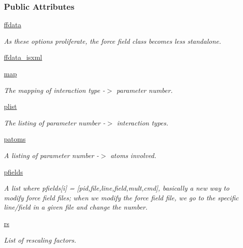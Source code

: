 \subsubsection*{Public Attributes}
\begin{DoxyCompactItemize}
\item 
\hyperlink{classsrc_1_1ffyapf_1_1FF_a68a3599d8d9a86173693142888875a75}{ffdata}
\begin{DoxyCompactList}\small\item\em As these options proliferate, the force field class becomes less standalone. \end{DoxyCompactList}\item 
\hyperlink{classsrc_1_1ffyapf_1_1FF_afdfcd362bdd2bee8c34193f0dda5aa3b}{ffdata\+\_\+isxml}
\item 
\hyperlink{classsrc_1_1ffyapf_1_1FF_ac0187f2700fff8b52387d1a9461bfacf}{map}
\begin{DoxyCompactList}\small\item\em The mapping of interaction type -\/$>$ parameter number. \end{DoxyCompactList}\item 
\hyperlink{classsrc_1_1ffyapf_1_1FF_a600c53e8b497f3cd6033ad04697fb40c}{plist}
\begin{DoxyCompactList}\small\item\em The listing of parameter number -\/$>$ interaction types. \end{DoxyCompactList}\item 
\hyperlink{classsrc_1_1ffyapf_1_1FF_a2e0e0f75682e55de01b54713d854528f}{patoms}
\begin{DoxyCompactList}\small\item\em A listing of parameter number -\/$>$ atoms involved. \end{DoxyCompactList}\item 
\hyperlink{classsrc_1_1ffyapf_1_1FF_a3a2bea7c7c3ecf63bb3cd98828c0fd58}{pfields}
\begin{DoxyCompactList}\small\item\em A list where pfields\mbox{[}i\mbox{]} = \mbox{[}pid,\textquotesingle{}file\textquotesingle{},line,field,mult,cmd\mbox{]}, basically a new way to modify force field files; when we modify the force field file, we go to the specific line/field in a given file and change the number. \end{DoxyCompactList}\item 
\hyperlink{classsrc_1_1ffyapf_1_1FF_a3ae060d14ad1de53e459619dfc738d65}{rs}
\begin{DoxyCompactList}\small\item\em List of rescaling factors. \end{DoxyCompactList}\item 

\end{DoxyCompactItemize}
